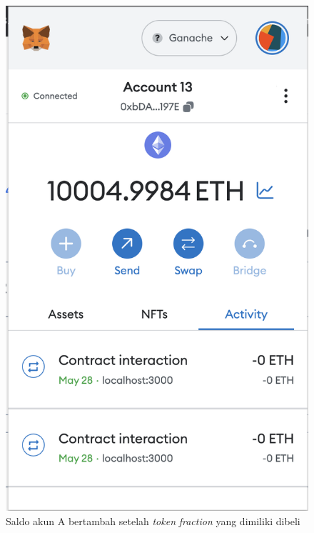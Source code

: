\begin{itemize}
        \begin{figure} [H] \centering
          \includegraphics[scale=0.4]{gambar/img-test-share-buy-6.png}
          \caption{Saldo akun A bertambah setelah \emph{token} \emph{fraction} yang dimiliki dibeli}
          \label{fig:TestShareResultBuy4}
        \end{figure}


\end{itemize}
